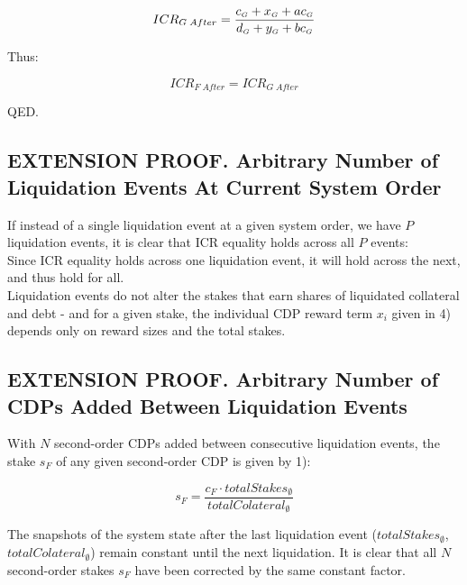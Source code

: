 \documentclass[reqno]{article}
\begin{document}
\begin{equation} 
    ICR_{G \; After}=\frac{c_\mathsmaller{G}+x_\mathsmaller{G}+ac_\mathsmaller{G}}{d_\mathsmaller{G}+y_\mathsmaller{G}+bc_\mathsmaller{G}}
\end{equation}

\bigskip
Thus:

\begin{equation} 
    ICR_{F \; After}=ICR_{G \; After}
\end{equation}

\bigskip
QED.

\subsection{EXTENSION PROOF. Arbitrary Number of Liquidation Events At Current System Order}

If instead of a single liquidation event at a given system order, we have $P$ liquidation events, it is clear that ICR equality holds across all $P$ events:\\

Since ICR equality holds across one liquidation event, it will hold across the next, and thus hold for all.\\

Liquidation events do not alter the stakes that earn shares of liquidated collateral and debt - and for a given stake, the individual CDP reward term $x_i$ given in 4) depends only on reward sizes and the total stakes.

\subsection{EXTENSION PROOF. Arbitrary Number of CDPs Added Between Liquidation Events}

With $N$ second-order CDPs added between consecutive liquidation events, the stake $s_F$ of any given second-order CDP is given by 1): 

\begin{equation} 
    s_F=\frac{c_F \cdot totalStakes_\emptyset}{totalColateral_\emptyset}
\end{equation}

\bigskip
The snapshots of the system state after the last liquidation event ($totalStakes_\emptyset$, $totalColateral_\emptyset$) remain constant until the next liquidation. It is clear that all $N$ second-order stakes $s_F$ have been corrected by the same constant factor.\\
\end{document}
